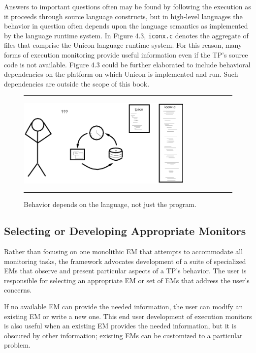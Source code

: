 Answers to important questions often may be found by following the
execution as it proceeds through source language constructs, but in
high-level languages the behavior in question often depends upon the
language semantics as implemented by the language runtime system.
In Figure 4.3, {\tt iconx.c} denotes the aggregate of files that
comprise the Unicon language runtime system.
For this reason, many forms of execution monitoring
provide useful information even if the TP's source code is not available.
Figure 4.3 could be further elaborated to include behavioral
dependencies on the platform on which Unicon is implemented and run.
Such dependencies are outside the scope of this book.

\begin{figure}[tb]
\hrule\bigskip
\centering

\hspace{0.05in}
\includegraphics[height=1.7in]{scene2.png}

\caption{Behavior depends on the language, not just the program.}
\medskip\hrule
\vspace{12pt}
\end{figure}

\subsection*{Selecting or Developing Appropriate Monitors}

Rather than focusing on one monolithic EM that attempts to accommodate
all monitoring tasks, the framework advocates development of a suite
of specialized EMs that observe and present particular aspects of a
TP's behavior.  The user is responsible for selecting an appropriate
EM or set of EMs that address the user's
concerns.

If no available EM can provide the needed information,
the user can modify an existing EM or write a new one.  This end user
development of execution monitors is also useful when an existing EM
provides the needed information, but it is obscured by other
information; existing EMs can be customized to a particular problem.

